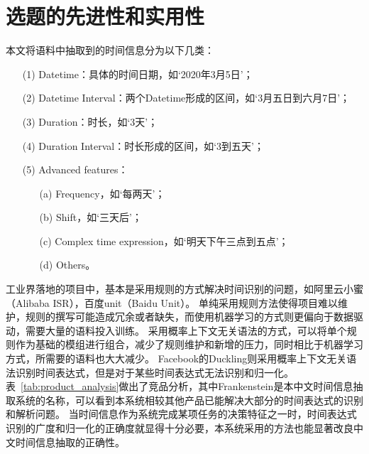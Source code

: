 \section{选题的先进性和实用性}

本文将语料中抽取到的时间信息分为以下几类：
\begin{enumerate}
    \item[(1)]  Datetime：具体的时间日期，如‘2020年3月5日’；
    \item[(2)]  Datetime Interval：两个Datetime形成的区间，如‘3月五日到六月7日’；
    \item[(3)]  Duration：时长，如‘3天’；
    \item[(4)]  Duration Interval：时长形成的区间，如‘3到五天’；
    \item[(5)]  Advanced features：
          \begin{enumerate}
              \item[(a)] Frequency，如‘每两天’；
              \item[(b)] Shift，如‘三天后’；
              \item[(c)] Complex time expression，如‘明天下午三点到五点’；
              \item[(d)] Others。
          \end{enumerate}
\end{enumerate}

工业界落地的项目中，基本是采用规则的方式解决时间识别的问题，如阿里云小蜜（Alibaba ISR），百度unit（Baidu Unit）。
单纯采用规则方法使得项目难以维护，规则的撰写可能造成冗余或者缺失，而使用机器学习的方式则更偏向于数据驱动，需要大量的语料投入训练。
采用概率上下文无关语法的方式，可以将单个规则作为基础的模组进行组合，减少了规则维护和新增的压力，同时相比于机器学习方式，所需要的语料也大大减少。
Facebook的Duckling则采用概率上下文无关语法识别时间表达式，但是对于某些时间表达式无法识别和归一化。
表~\ref{tab:product_analysis}做出了竞品分析，其中Frankenstein是本中文时间信息抽取系统的名称，可以看到本系统相较其他产品已能解决大部分的时间表达式的识别和解析问题。
当时间信息作为系统完成某项任务的决策特征之一时，时间表达式识别的广度和归一化的正确度就显得十分必要，本系统采用的方法也能显著改良中文时间信息抽取的正确性。

